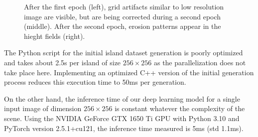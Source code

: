 \begin{figure}
    \caption{After the first epoch (left), grid artifacts similar to low resolution image are visible, but are being corrected during a second epoch (middle). After the second epoch, erosion patterns appear in the hieght fields (right).}
    \label{fig:coral-island_first-epoch}
\end{figure}


The Python script for the initial island dataset generation is poorly optimized and takes about 2.5s per island of size $256 \times 256$ as the parallelization does not take place here. Implementing an optimized C++ version of the initial generation process reduces this execution time to 50ms per generation.

On the other hand, the inference time of our deep learning model for a single input image of dimension $256 \times 256$ is constant whatever the complexity of the scene. Using the NVIDIA GeForce GTX 1650 Ti GPU with Python 3.10 and PyTorch version 2.5.1+cu121, the inference time measured is 5ms (std 1.1ms). 

